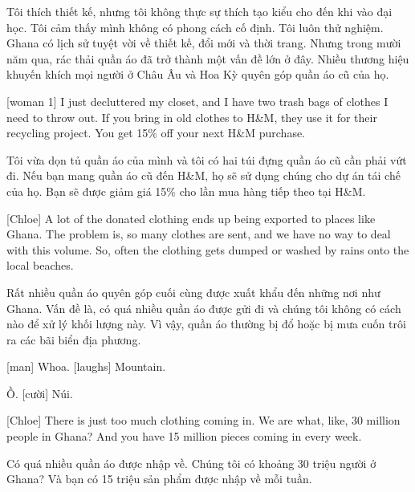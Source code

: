 \documentclass[a4paper]{article}
\begin{document}
	\begin{vietnamese-v2}
		Tôi thích thiết kế, nhưng tôi không thực sự thích tạo kiểu cho đến khi vào đại học.
		Tôi cảm thấy mình không có phong cách cố định. Tôi luôn thử nghiệm.
		Ghana có lịch sử tuyệt vời về thiết kế, đổi mới và thời trang.
		Nhưng trong mười năm qua, rác thải quần áo đã trở thành một vấn đề lớn ở đây.
		Nhiều thương hiệu khuyến khích mọi người ở Châu Âu và Hoa Kỳ quyên góp quần áo cũ của họ.
	\end{vietnamese-v2}
	
	
	[woman 1] I just decluttered my closet, and I have two trash bags of clothes I need to throw out.
	If you bring in old clothes to H\&M, they use it for their recycling project.
	You get 15\% off your next H\&M purchase.
	
	\begin{vietnamese-v2}
		 Tôi vừa dọn tủ quần áo của mình và tôi có hai túi đựng quần áo cũ cần phải vứt đi.
		Nếu bạn mang quần áo cũ đến H\&M, họ sẽ sử dụng chúng cho dự án tái chế của họ.
		Bạn sẽ được giảm giá 15\% cho lần mua hàng tiếp theo tại H\&M.
	\end{vietnamese-v2}
	
	[Chloe] A lot of the donated clothing ends up being exported to places like Ghana.
	The problem is, so many clothes are sent, and we have no way to deal with this volume.
	So, often the clothing gets dumped or washed by rains onto the local beaches.
	
	\begin{vietnamese-v2}
		[Chloe] Rất nhiều quần áo quyên góp cuối cùng được xuất khẩu đến những nơi như Ghana.
		Vấn đề là, có quá nhiều quần áo được gửi đi và chúng tôi không có cách nào để xử lý khối lượng này.
		Vì vậy, quần áo thường bị đổ hoặc bị mưa cuốn trôi ra các bãi biển địa phương.
	\end{vietnamese-v2}
	
	[man] Whoa.
	[laughs]
	Mountain.
	
	\begin{vietnamese-v2}
		 Ồ.
		[cười]
		Núi.
	\end{vietnamese-v2}
	
	[Chloe] There is just too much clothing coming in.
	We are what, like, 30 million people in Ghana?
	And you have 15 million pieces coming in every week.
	
	\begin{vietnamese-v2}
		[Chloe] Có quá nhiều quần áo được nhập về.
		Chúng tôi có khoảng 30 triệu người ở Ghana?
		Và bạn có 15 triệu sản phẩm được nhập về mỗi tuần.
	\end{vietnamese-v2}
	
\end{document}
